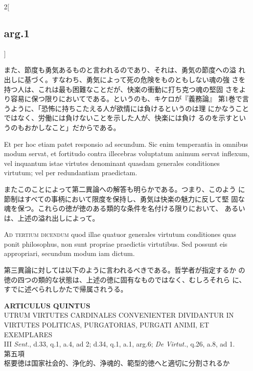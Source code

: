 \documentclass[paper=a4paper,fontsize=10pt,jafontsize=9pt,titlepage]{jlreq}
\begin{document}
\begin{paracol}{2}[\subsection{arg.1}]
\switchcolumn

また、節度も勇気あるものと言われるのであり、それは、勇気の節度への溢
 れ出しに基づく。すなわち、勇気によって死の危険をものともしない魂の強
 さを持つ人は、これは最も困難なことだが、快楽の衝動に打ち克つ魂の堅固
 さをより容易に保つ限りにおいてである。というのも、キケロが『義務論』
 第1巻で言うように、「恐怖に持ちこたえる人が欲情には負けるというのは理
 にかなうことではなく、労働には負けないことを示した人が、快楽には負け
 るのを示すというのもおかしなこと」だからである。

\switchcolumn*[\subsection{ad.2}]

Et per hoc etiam patet responsio ad secundum. Sic enim temperantia in
omnibus modum servat, et fortitudo contra illecebras voluptatum animum
servat inflexum, vel inquantum istae virtutes denominant quasdam
generales conditiones virtutum; vel per redundantiam praedictam.

\switchcolumn

またこのことによって第二異論への解答も明らかである。つまり、このよう
 に節制はすべての事柄において限度を保持し、勇気は快楽の魅力に反して堅
 固な魂を保つ。これらの徳が徳のある類的な条件を名付ける限りにおいて、
 あるいは、上述の溢れ出しによって。

\switchcolumn*[\subsection{ad.3}]

{\scshape Ad tertium dicendum} quod illae quatuor generales virtutum
conditiones quas ponit philosophus, non sunt propriae praedictis
virtutibus. Sed possunt eis appropriari, secundum modum iam dictum.

\switchcolumn

第三異論に対しては以下のように言われるべきである。哲学者が指定するか
 の徳の四つの類的な状態は、上述の徳に固有なものではなく、むしろそれら
 に、すでに述べられしかたで帰属されうる。

\end{paracol}
\newpage
{}
{}
\setcounter{section}{5}
\setcounter{subsection}{0}

\begin{center}
{\Large {\bfseries ARTICULUS QUINTUS}}\\
{\large UTRUM VIRTUTES CARDINALES CONVENIENTER DIVIDANTUR IN VIRTUTES POLITICAS, PURGATORIAS, PURGATI ANIMI, ET EXEMPLARES}\\
{\footnotesize III {\itshape Sent.}, d.33, q.1, a.4, ad 2; d.34, q.1, a.1, arg.6; {\itshape De Virtut.}, q.26, a.8, ad 1.}\\
{\Large 第五項\\枢要徳は国家社会的、浄化的、浄魂的、範型的徳へと適切に分割されるか}
\end{center}
\end{document}
